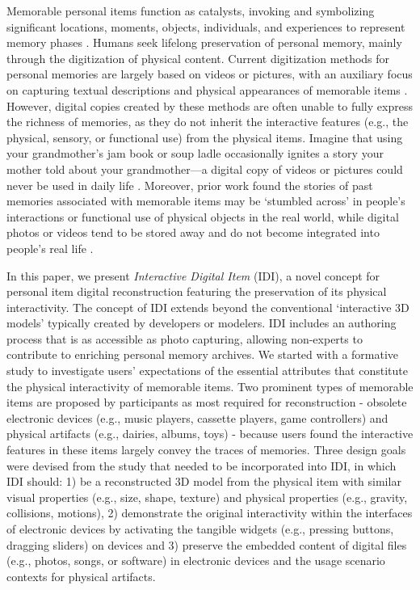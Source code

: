 Memorable personal items function as catalysts, invoking and symbolizing significant locations, moments, objects, individuals, and experiences to represent memory phases \cite{10.1145/1806923.1806924,petrelli2010family, bowen2011remembering}. Humans seek lifelong preservation of personal memory, mainly through the digitization of physical content.
Current digitization methods for personal memories are largely based on videos or pictures, with an auxiliary focus on capturing textual descriptions and physical appearances of memorable items \cite{petrelli2010family,KALNIKAITE2011298}. 
However, digital copies created by these methods are often unable to fully express the richness of memories, as they do not inherit the interactive features (e.g., the physical, sensory, or functional use) from the physical items. 
Imagine that using your grandmother’s jam book or soup ladle occasionally ignites a story your mother told about your grandmother---a digital copy of videos or pictures could never be used in daily life \cite{10.1145/1806923.1806924}.
Moreover, prior work found the stories of past memories associated with memorable items may be `stumbled across' in people's interactions or functional use of physical objects in the real world, while digital photos or videos tend to be stored away and do not become integrated into people's real life \cite{petrelli2010family,KALNIKAITE2011298,west2007memento}.


In this paper, we present \textit{Interactive Digital Item} (IDI), a novel concept for personal item digital reconstruction featuring the preservation of its physical interactivity. 
The concept of IDI extends beyond the conventional `interactive 3D models' typically created by developers or modelers. IDI includes an authoring process that is as accessible as photo capturing, allowing non-experts to contribute to enriching personal memory archives.
We started with a formative study to investigate users' expectations of the essential attributes that constitute the physical interactivity of memorable items.
Two prominent types of memorable items are proposed by participants as most required for reconstruction - obsolete electronic devices (e.g., music players, cassette players, game controllers) and physical artifacts (e.g., dairies, albums, toys) - because users found the interactive features in these items largely convey the traces of memories.
Three design goals were devised from the study that needed to be incorporated into IDI, in which IDI should: 1) be a reconstructed 3D model from the physical item with similar visual properties (e.g., size, shape, texture) and physical properties (e.g., gravity, collisions, motions), 2) demonstrate the original interactivity within the interfaces of electronic devices by activating the tangible widgets (e.g., pressing buttons, dragging sliders) on devices and 3) preserve the embedded content of digital files (e.g., photos, songs, or software) in electronic devices and the usage scenario contexts for physical artifacts.





